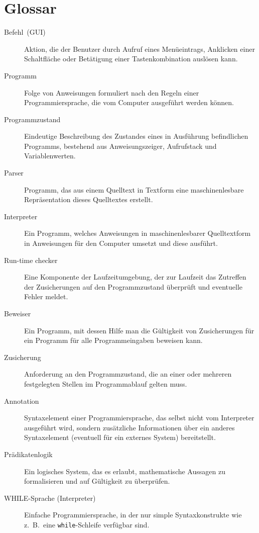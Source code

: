\section{Glossar}


\begin{description}
    \item[Befehl~(GUI)] Aktion, die der Benutzer durch Aufruf eines Menüeintrags, Anklicken einer Schaltfläche oder Betätigung einer Tastenkombination auslösen kann.
    \item[Programm] Folge von Anweisungen formuliert nach den Regeln einer Programmiersprache, die vom Computer ausgeführt werden können.
    \item[Programmzustand] Eindeutige Beschreibung des Zustandes eines in Ausführung befindlichen Programms, bestehend aus Anweisungszeiger, Aufrufstack und Variablenwerten.
    \item[Parser] Programm, das aus einem Quelltext in Textform eine maschinenlesbare Repräsentation dieses Quelltextes erstellt.
    \item[Interpreter] Ein Programm, welches Anweisungen in maschinenlesbarer Quelltextform in Anweisungen für den Computer umsetzt und diese ausführt.
    \item[Run-time checker] Eine Komponente der Laufzeitumgebung, der zur Laufzeit das Zutreffen der Zusicherungen auf den Programmzustand überprüft und eventuelle Fehler meldet.
    \item[Beweiser] Ein Programm, mit dessen Hilfe man die Gültigkeit von Zusicherungen für ein Programm für alle Programmeingaben beweisen kann.
    \item[Zusicherung] Anforderung an den Programmzustand, die an einer oder mehreren festgelegten Stellen im Programmablauf gelten muss.
    \item[Annotation] Syntaxelement einer Programmiersprache, das selbst nicht vom Interpreter ausgeführt wird, sondern zusätzliche Informationen über ein anderes Syntaxelement (eventuell für ein externes System) bereitstellt.
    \item[Prädikatenlogik] Ein logisches System, das es erlaubt, mathematische Aussagen zu formalisieren und auf Gültigkeit zu überprüfen. %
    \item[WHILE-Sprache (Interpreter)] Einfache Programmiersprache, in der nur simple Syntaxkonstrukte wie z.~B.\ eine \texttt{while}-Schleife verfügbar sind.

\end{description}
